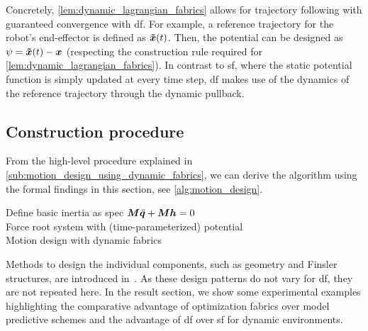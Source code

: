 Concretely, \cref{lem:dynamic_lagrangian_fabrics} allows for trajectory following
with guaranteed convergence with \ac{df}. For example, a reference trajectory 
for the robot's end-effector is defined as $\bm{\tilde{x}}(t)$. Then, the potential can be designed
as $\psi = \bm{\tilde{x}}(t) - \bm{x}$ (respecting the construction rule required
for \cref{lem:dynamic_lagrangian_fabrics}). In contrast to \ac{sf}, where the static
potential function is simply updated at every time step, \ac{df} makes use of the dynamics 
of the reference trajectory through the dynamic pullback.

\subsection{Construction procedure}

From the high-level procedure explained in \cref{sub:motion_design_using_dynamic_fabrics}, we can
derive the algorithm using the formal findings in this section, see \cref{alg:motion_design}.
\begin{algorithm}
  Define basic inertia as spec $\bm{M}\ddot{\bm{q}} + \bm{M}\bm{h} = 0$ \\
  Force root system with (time-parameterized) potential\\
  \caption{Motion design with dynamic fabrics}
  \label{alg:motion_design}
\end{algorithm}

Methods to design the individual components, such as geometry and 
Finsler structures, are introduced in~\cite{Ratliff2020}.
As these design patterns do not vary for \ac{df}, they are not repeated here.
In the result section, we show some experimental examples highlighting
the comparative advantage of
optimization fabrics over model predictive schemes and the advantage of \ac{df}
over \ac{sf} for dynamic environments.

